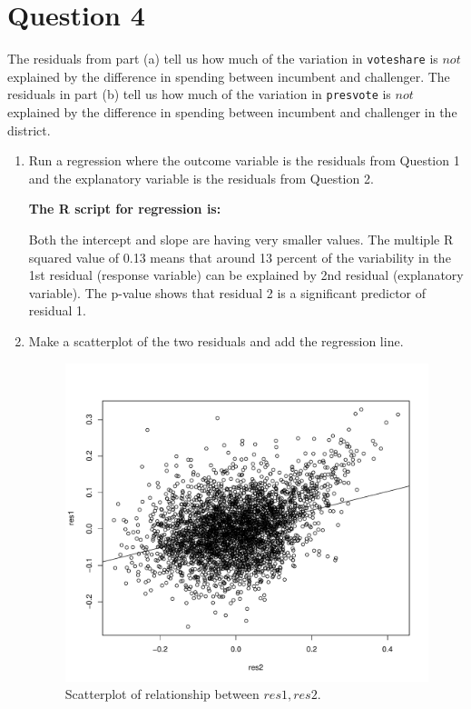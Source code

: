 \documentclass[12pt,letterpaper]{article}
\begin{document}
\newpage	

\section*{Question 4}
\noindent The residuals from part (a) tell us how much of the variation in \texttt{voteshare} is $not$ explained by the difference in spending between incumbent and challenger. The residuals in part (b) tell us how much of the variation in \texttt{presvote} is $not$ explained by the difference in spending between incumbent and challenger in the district.
	\begin{enumerate}
		\item Run a regression where the outcome variable is the residuals from Question 1 and the explanatory variable is the residuals from Question 2.
		
		\textbf{		The R script for regression is:}
		 
		
		
		Both the intercept and slope are having very smaller values. The multiple R squared value of 0.13 means that around 13 percent of the variability in the 1st residual (response variable) can be explained by 2nd residual (explanatory variable). The p-value shows that residual 2 is a significant predictor of residual 1.
		
		\item Make a scatterplot of the two residuals and add the regression line. 
		
		
		  
		
		
		\begin{figure}[h!]\centering	\caption{\footnotesize Scatterplot of relationship between $res1, res2$.}	
			
			\includegraphics[width=.6\textwidth]{plot4.pdf}
			

\end{figure}
\end{enumerate}
\end{document}
